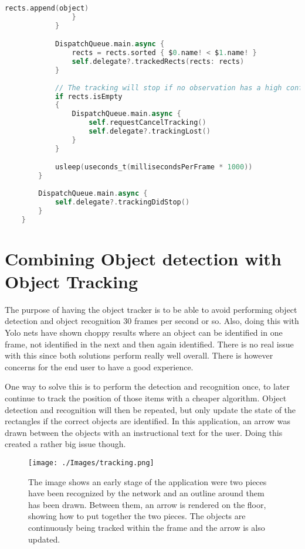 \begin{lstlisting}[language=swift]
                    rects.append(object)
                }
            }

            DispatchQueue.main.async {
                rects = rects.sorted { $0.name! < $1.name! }
                self.delegate?.trackedRects(rects: rects)
            }
            
            // The tracking will stop if no observation has a high confidence value
            if rects.isEmpty
            {
                DispatchQueue.main.async {
                    self.requestCancelTracking()
                    self.delegate?.trackingLost()
                }
            }

            usleep(useconds_t(millisecondsPerFrame * 1000))
        }
        
        DispatchQueue.main.async {
            self.delegate?.trackingDidStop()
        }
    }
\end{lstlisting}


\section{Combining Object detection with Object Tracking}
The purpose of having the object tracker is to be able to avoid performing object detection and object recognition 30 frames per second or so. Also, doing this with Yolo nets have shown choppy results where an object can be identified in one frame, not identified in the next and then again identified.
There is no real issue with this since both solutions perform really well overall. There is however concerns for the end user to have a good experience.

One way to solve this is to perform the detection and recognition once, to later continue to track the position of those items with a cheaper algorithm.
Object detection and recognition will then be repeated, but only update the state of the rectangles if the correct objects are identified.
In this application, an arrow was drawn between the objects with an instructional text for the user. Doing this created a rather big issue though.

\begin{figure}[!hbtp]
\begin{center}
\texttt{[image: ./Images/tracking.png]}
\caption{The image shows an early stage of the application were two pieces have been recognized by the network and an outline around them has been drawn. Between them, an arrow is rendered on the floor, showing how to put together the two pieces. The objects are continuously being tracked within the frame and the arrow is also updated.}
\label{fig:tracking}
\end{center}
\end{figure}


